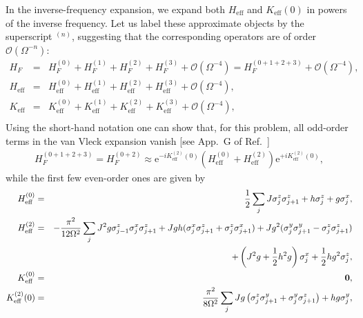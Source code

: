 \documentclass{SciPost}
\newcommand\0{\scalebox{-1}[1]{0}}
\begin{document}
In the inverse-frequency expansion, we expand both $H_\mathrm{eff}$ and $K_\mathrm{eff}(0)$ in powers of the inverse frequency. Let us label these approximate objects by the superscript $^{(n)}$, suggesting that the corresponding operators are of order $\mathcal{O}(\Omega^{-n})$:
\begin{eqnarray*}
H_F &=& H_F^{(0)} + H_F^{(1)} + H_F^{(2)} + H_F^{(3)} + \mathcal{O}(\Omega^{-4}) = H_F^{(0+1+2+3)} + \mathcal{O}(\Omega^{-4}), \nonumber\\ 
H_\mathrm{eff} &=& H_\mathrm{eff}^{(0)} + H_\mathrm{eff}^{(1)} + H_\mathrm{eff}^{(2)} + H_\mathrm{eff}^{(3)} + \mathcal{O}(\Omega^{-4}), \nonumber\\ 
K_\mathrm{eff} &=& K_\mathrm{eff}^{(0)} + K_\mathrm{eff}^{(1)} + K_\mathrm{eff}^{(2)} + K_\mathrm{eff}^{(3)} + \mathcal{O}(\Omega^{-4}), \nonumber\\ 
\end{eqnarray*}
Using the short-hand notation one can show that, for this problem, all odd-order terms in the van Vleck expansion vanish [see App.~G of Ref.~\cite{floquet_thesis}]
\begin{eqnarray}
H_F^{(0+1+2+3)} = H_F^{(0+2)}\approx \mathrm e^{-iK_\mathrm{eff}^{(2)}(0)}\left( H_\mathrm{eff}^{(0)} + H_\mathrm{eff}^{(2)} \right)\mathrm e^{+iK_\mathrm{eff}^{(2)}(0)}, 
\end{eqnarray}
while the first few even-order ones are given by
\begin{eqnarray}
\label{eq:vV_corrs}
H_\mathrm{eff}^{(0)} &=& \frac{1}{2}\sum_j J\sigma^z_j\sigma^z_{j+1} + h\sigma^z_j + g\sigma^x_j,\nonumber\\
H_\mathrm{eff}^{(2)} &=& -\frac{\pi^2}{12\Omega^2}\sum_j J^2g\sigma^z_{j-1}\sigma^x_j\sigma^z_{j+1} + Jgh(\sigma^x_j\sigma^z_{j+1} + \sigma^z_j\sigma^x_{j+1}) + Jg^2(\sigma^y_j\sigma^y_{j+1}-\sigma^z_j\sigma^z_{j+1}) \nonumber\\
&& \quad \qquad\qquad + \left(J^2g + \frac{1}{2}h^2g\right)\sigma^x_j + \frac{1}{2}hg^2\sigma^z_j,\nonumber\\
K_\mathrm{eff}^{(0)} &=& {\bf 0},\nonumber\\
K_\mathrm{eff}^{(2)}(0) &=& \frac{\pi^2}{8\Omega^2}\sum_j Jg\left(\sigma^z_j\sigma^y_{j+1} + \sigma^y_j\sigma^z_{j+1}\right) +hg\sigma^y_j,
\end{eqnarray}
\end{document}
